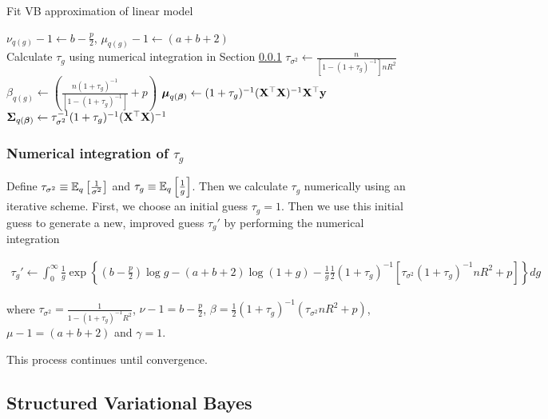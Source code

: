 \documentclass{amsart}[12pt]
\begin{document}
\begin{algorithm}
\label{alg:algorithm_one}
\caption{Fit VB approximation of linear model}
\begin{algorithmic}
\REQUIRE $\nu_{q(g)} - 1 \leftarrow b - \frac{p}{2}$, $\mu_{q(g)} - 1 \leftarrow (a + b + 2)$ \\
\STATE Calculate $\tau_{g}$ using numerical integration in Section \ref{sec:num_int}
\ENDWHILE
\STATE $\tau_{\sigma^2} \leftarrow \frac{n}{[1 - (1 + \tau_g)^{-1}] n R^2}$
\STATE $\beta_{q(g)} \leftarrow \left(\frac{n (1 + \tau_g)^{-1}}{[1 - (1 + \tau_g)^{-1}]} + p \right)$
\STATE ${\boldsymbol \mu}_{q({\boldsymbol \beta})} \leftarrow (1 + \tau_g)^{-1} ({\bf X}^\top {\bf X})^{-1} {\bf X}^\top {\bf y}$
\STATE ${\boldsymbol \Sigma}_{q({\boldsymbol \beta})} \leftarrow \tau_{\sigma^2}^{-1} (1 + \tau_{g})^{-1}({\bf X}^\top {\bf X})^{-1}$
\end{algorithmic}
\end{algorithm}

\subsubsection{Numerical integration of $\tau_g$}\label{sec:num_int}

Define $\tau_{\sigma^2} \equiv \mathbb{E}_q \left[ \frac{1}{\sigma^2} \right]$ and
$\tau_g \equiv \mathbb{E}_q \left[ \frac{1}{g} \right]$. Then we calculate $\tau_g$ numerically using an iterative 
scheme. First, we choose an initial guess $\tau_g = 1$. Then we use this initial guess to generate a new,
improved guess $\tau_g'$ by performing the numerical integration

\begin{align*}
\tau_g' \leftarrow \int_0^\infty \frac{1}{g} \exp \left \{ \left(b - \frac{p}{2}\right) \log g
- (a + b + 2) \log(1 + g)
- \frac{1}{g} \frac{1}{2} (1 + \tau_g)^{-1} [\tau_{\sigma^2} (1 + \tau_g)^{-1} n R^2 + p]
	  \right \} dg
\end{align*}

where $\tau_{\sigma^2} = \frac{1}{1 - (1 + \tau_g)^{-1} R^2}$, $\nu - 1 = b - \frac{p}{2}$, 
$\beta = \frac{1}{2} (1 + \tau_g)^{-1} (\tau_{\sigma^2} n R^2 + p)$, 
$\mu - 1 = (a + b + 2)$ and $\gamma = 1$. 


This process continues until convergence.

\subsection{Structured Variational Bayes}
\end{document}
